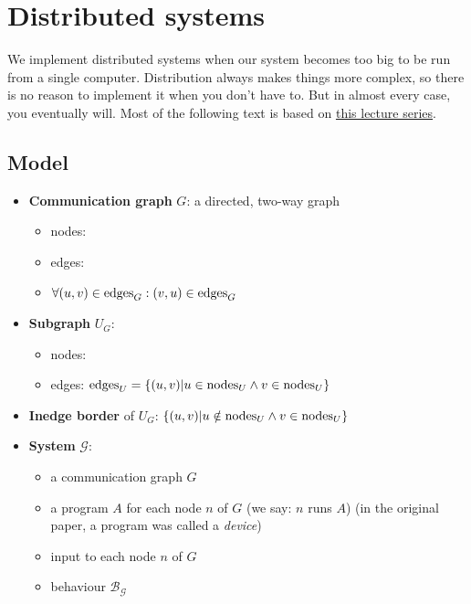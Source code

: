 \section{Distributed systems}

We implement distributed systems when our system becomes too big to be run from a single computer. Distribution always makes things more complex, so there is no reason to implement it when you don't have to. But in almost every case, you eventually will. Most of the following text is based on \href{https://disco.ethz.ch/courses/podc_allstars/lecture/chapter17.pdf}{this lecture series}.

\subsection{Model}
\begin{itemize}
    \item \textbf{Communication graph} $G$: a directed, two-way graph
      \begin{itemize}
        \item nodes: 
        \item edges: 
        \item $\forall (u, v) \in  \text{edges}_{G} : (v, u) \in  \text{edges}_{G} $
      \end{itemize}
    \item \textbf{Subgraph} $U_G$:
      \begin{itemize}
        \item nodes: 
        \item edges: $ \text{edges}_{U}  = \{(u, v) | u \in  \text{nodes}_{U}  \land v \in  \text{nodes}_{U} \}$
      \end{itemize}
    \item \textbf{Inedge border} of $U_G$: $\{(u, v) | u \notin  \text{nodes}_{U}  \land v \in  \text{nodes}_{U} \}$
    \item \textbf{System} $\mathcal{G}$:
      \begin{itemize}
        \item a communication graph $G$
        \item a program $A$ for each node $n$ of $G$ (we say: $n$ runs $A$) (in the original paper, a program was called a \emph{device})
        \item input to each node $n$ of $G$
        \item behaviour $\mathcal{B_G}$
      \end{itemize}
\end{itemize}


